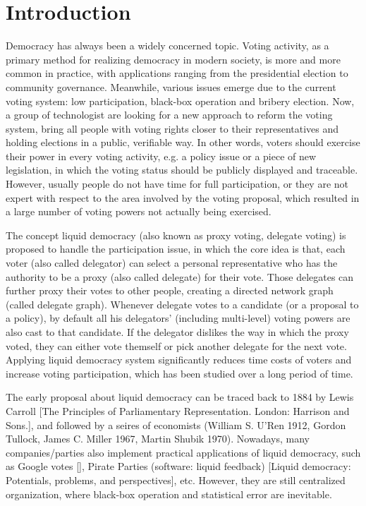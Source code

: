 \section{Introduction}
Democracy has always been a widely concerned topic. Voting activity, as a primary method for realizing democracy in modern society,  is more and more common in practice, with applications ranging from the presidential election to community governance. Meanwhile, various issues emerge due to the current voting system: low participation, black-box operation and bribery election. Now, a group of technologist are looking for a new approach to reform the voting system, bring all people with voting rights closer to their representatives and holding elections in a public, verifiable way. In other words, voters should exercise their power in every voting activity, e.g. a policy issue or a piece of new legislation, in which the voting status should be publicly displayed and traceable. However, usually people do not have time for full participation, or they are not expert with respect to the area involved by the voting proposal, which resulted in a large number of voting powers not actually being exercised.

The concept liquid democracy (also known as proxy voting, delegate voting) is proposed to handle the participation issue, in which the core idea is that, each voter (also called delegator) can select a personal representative who has the authority to be a proxy (also called delegate) for their vote.  Those delegates can further proxy their votes to other people, creating a directed network graph (called delegate graph). Whenever delegate votes to a candidate (or a proposal to a policy), by default all his delegators' (including multi-level) voting powers are also cast to that candidate. If the delegator dislikes the way in which the proxy voted, they can either vote themself or pick another delegate for the next vote. Applying liquid democracy system significantly reduces time costs of voters and increase voting participation, which has been studied over a long period of time.

The early proposal about liquid democracy can be traced back to 1884 by Lewis Carroll [The Principles of Parliamentary Representation. London: Harrison and Sons.], and followed by a seires of economists (William S. U'Ren 1912,  Gordon Tullock, James C. Miller 1967, Martin Shubik 1970). Nowadays, many companies/parties also implement practical applications of liquid democracy, such as Google votes [], Pirate Parties (software: liquid feedback) [Liquid democracy: Potentials, problems, and perspectives], etc. However, they are still centralized organization, where black-box operation and statistical error are inevitable.

